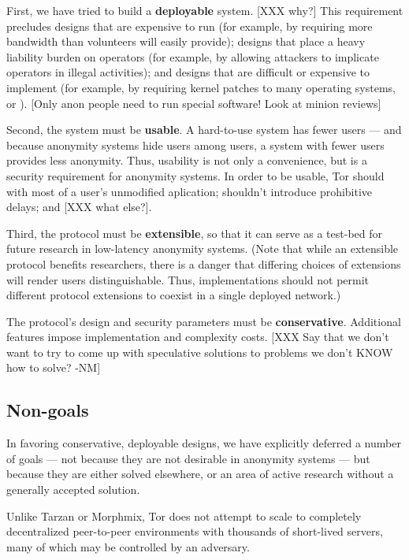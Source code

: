 \documentclass[times,10pt,twocolumn]{article}
\begin{document}
First, we have tried to build a {\bf deployable} system.  [XXX why?]
This requirement precludes designs that are expensive to run (for
example, by requiring more bandwidth than volunteers will easily
provide); designs that place a heavy liability burden on operators
(for example, by allowing attackers to implicate operators in illegal
activities); and designs that are difficult or expensive to implement
(for example, by requiring kernel patches to many operating systems,
or ).  [Only anon people need to run special software!  Look at minion
reviews]  

Second, the system must be {\bf usable}.  A hard-to-use system has
fewer users --- and because anonymity systems hide users among users, a
system with fewer users provides less anonymity.  Thus, usability is
not only a convenience, but is a security requirement for anonymity
systems.  In order to be usable, Tor should with most of a
user's unmodified aplication; shouldn't introduce prohibitive delays; and 
[XXX what else?].

Third, the protocol must be {\bf extensible}, so that it can serve as
a test-bed for future research in low-latency anonymity systems.
(Note that while an extensible protocol benefits researchers, there is
a danger that differing choices of extensions will render users
distinguishable.  Thus, implementations should not permit different
protocol extensions to coexist in a single deployed network.)


The protocol's design and security parameters must be {\bf
conservative}.  Additional features impose implementation and
complexity costs. [XXX Say that we don't want to try to come up with
speculative solutions to problems we don't KNOW how to solve? -NM]

\subsection{Non-goals}
In favoring conservative, deployable designs, we have explicitly
deferred a number of goals --- not because they are not desirable in
anonymity systems --- but because they are either solved
elsewhere, or an area of active research without a generally accepted
solution.

Unlike Tarzan or Morphmix, Tor does not attempt to scale to completely
decentralized peer-to-peer environments with thousands of short-lived
servers, many of which may be controlled by an adversary.
\end{document}
